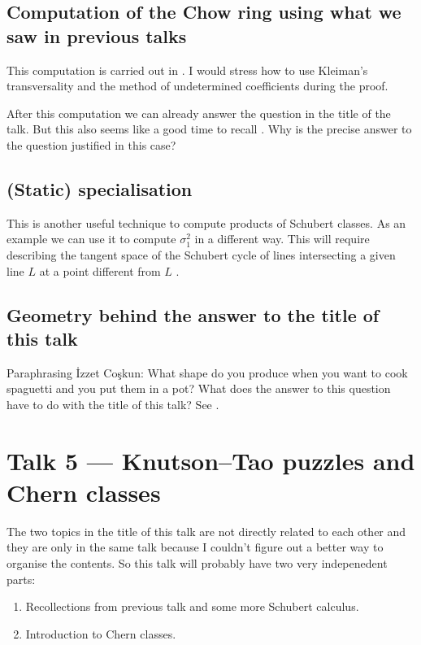 \documentclass[A4paper, 12pt, british, reqno]{amsart}
\theoremstyle{plain}
\theoremstyle{definition}
\theoremstyle{remark}
\theoremstyle{plain}
\theoremstyle{definition}
\theoremstyle{remark}
\theoremstyle{plain}
\theoremstyle{definition}
\theoremstyle{remark}
\begin{document}
\subsection{Computation of the Chow ring using what we saw in previous talks}
This computation is carried out in \cite[Thm.~3.10]{eh16}.
I would stress how to use Kleiman's transversality \cite[Thm.~1.7]{eh16} and the method of undetermined coefficients during the proof.

After this computation we can already answer the question in the title of the talk.
But this also seems like a good time to recall .
Why is the precise answer to the question justified in this case?

\subsection{(Static) specialisation \cite[\S 3.5.1]{eh16}}
This is another useful technique to compute products of Schubert classes.
As an example we can use it to compute $\sigma_{1}^{2}$ in a different way.
This will require describing the tangent space of the Schubert cycle of lines intersecting a given line $L$ at a point different from $L$ \cite[Exe.~3.26]{eh16}.

\subsection{Geometry behind the answer to the title of this talk}
Paraphrasing \.{I}zzet Co\c{s}kun: What shape do you produce when you want to cook spaguetti and you put them in a pot?
What does the answer to this question have to do with the title of this talk?
See \cite[\S 3.4.1]{eh16}.

\section{Talk 5 --- Knutson--Tao puzzles and Chern classes}

The two topics in the title of this talk are not directly related to each other and they are only in the same talk because I couldn't figure out a better way to organise the contents.
So this talk will probably have two very indepenedent parts:
\begin{enumerate}
    \item Recollections from previous talk and some more Schubert calculus.
    \item Introduction to Chern classes.
\end{enumerate}
\end{document}
